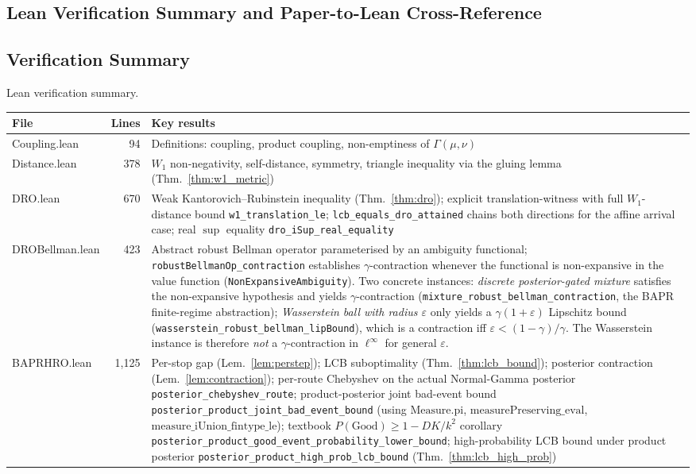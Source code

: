\documentclass[opre,dblanonrev]{informs4}
\begin{document}
\begin{APPENDICES}
\section{Lean Verification Summary and Paper-to-Lean Cross-Reference}
\label{ec:lean_tables}

\subsection{Verification Summary}

\begin{table}
\TABLE
{Lean verification summary.\label{tab:lean}}
{\scriptsize\begin{tabular}{lrp{8.4cm}}
\toprule
File & Lines & Key results \\
\midrule
Coupling.lean & 94 & Definitions: coupling, product coupling, non-emptiness of $\Gamma(\mu,\nu)$ \\
Distance.lean & 378 & $W_1$ non-negativity, self-distance, symmetry, triangle inequality via the gluing lemma (Thm.~\ref{thm:w1_metric}) \\
DRO.lean & 670 & Weak Kantorovich--Rubinstein inequality (Thm.~\ref{thm:dro}); explicit translation-witness with full $W_1$-distance bound \texttt{w1\_translation\_le}; \texttt{lcb\_equals\_dro\_attained} chains both directions for the affine arrival case; real $\sup$ equality \texttt{dro\_iSup\_real\_equality} \\
DROBellman.lean & 423 & Abstract robust Bellman operator parameterised by an ambiguity functional; \texttt{robustBellmanOp\_contraction} establishes $\gamma$-contraction whenever the functional is non-expansive in the value function (\texttt{NonExpansiveAmbiguity}). Two concrete instances: \emph{discrete posterior-gated mixture} satisfies the non-expansive hypothesis and yields $\gamma$-contraction (\texttt{mixture\_robust\_bellman\_contraction}, the BAPR finite-regime abstraction); \emph{Wasserstein ball with radius $\varepsilon$} only yields a $\gamma(1+\varepsilon)$ Lipschitz bound (\texttt{wasserstein\_robust\_bellman\_lipBound}), which is a contraction iff $\varepsilon\!<\!(1-\gamma)/\gamma$. The Wasserstein instance is therefore \emph{not} a $\gamma$-contraction in $\ell^\infty$ for general $\varepsilon$. \\
BAPRHRO.lean & 1{,}125 & Per-stop gap (Lem.~\ref{lem:perstep}); LCB suboptimality (Thm.~\ref{thm:lcb_bound}); posterior contraction (Lem.~\ref{lem:contraction}); per-route Chebyshev on the actual Normal-Gamma posterior \texttt{posterior\_chebyshev\_route}; product-posterior joint bad-event bound \texttt{posterior\_product\_joint\_bad\_event\_bound} (using $\mathrm{Measure.pi}$, $\mathrm{measurePreserving\_eval}$, $\mathrm{measure\_iUnion\_fintype\_le}$); textbook $P(\mathrm{Good}) \geq 1 - DK/k^2$ corollary \texttt{posterior\_product\_good\_event\_probability\_lower\_bound}; high-probability LCB bound under product posterior \texttt{posterior\_product\_high\_prob\_lcb\_bound} (Thm.~\ref{thm:lcb_high_prob}) \\

\end{tabular}}
\end{table}
\end{APPENDICES}
\end{document}

